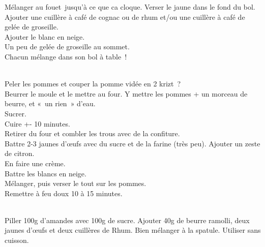 \begin{minipage}[c]{\textwidth}
Mélanger au fouet jusqu’à ce que ca cloque. Verser le jaune dans le fond du bol. \\
Ajouter une cuillère à café de cognac ou de rhum et/ou une cuillère à café de gelée de groseille. \\
Ajouter le blanc en neige. \\
Un peu de gelée de groseille au sommet. \\
Chacun mélange dans son bol à table !\\
\\

\end{minipage}

\begin{minipage}[c]{\textwidth}
Peler les pommes et couper la pomme vidée en 2 krizt ?\\
Beurrer le moule et le mettre au four. Y mettre les pommes + un morceau de beurre, et « un rien » d’eau. \\
Sucrer. \\
Cuire +- 10 minutes. \\
Retirer du four et combler les trous avec de la confiture. \\
Battre 2-3 jaunes d’œufs avec du sucre et de la farine (très peu). Ajouter un zeste de citron. \\
En faire une crème.  \\
Battre les blancs en neige. \\
Mélanger, puis verser le tout sur les pommes. \\
Remettre à feu doux 10 à 15 minutes. \\
\\

\end{minipage}

\begin{minipage}[c]{\textwidth}
Piller 100g d’amandes avec 100g de sucre. Ajouter 40g de beurre ramolli, deux jaunes d’œufs et deux cuillères de Rhum. Bien mélanger à la spatule. Utiliser sans cuisson.\\
\\

\end{minipage}

